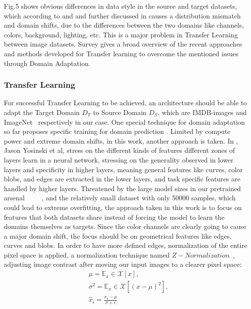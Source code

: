 \documentclass[conference]{IEEEtran}
\begin{document}
                Fig.5 shows obvious differences in data style in the source and target datasets, which according to \cite{lookatdata} and \cite{improving} and further discussed in \cite{decadesurv} causes a distribution mismatch and domain shifts, due to the differences between the two domains like channels, colors, background,
				lighting, etc. This is a major problem in Transfer Learning between 
				image datasets. Survey \cite{domainshift} gives a broad overview of the recent approaches and methods developed for Transfer learning to overcome the mentioned issues through Domain Adaptation. 
				
                
\subsubsection{Transfer Learning}
                For successful Transfer Learning to be achieved, an architecture should
				be able to adapt the Target Domain $D_T$ to Source Domain
				$D_S$, which are IMDB-images and ImageNet~\cite{imagenet} respectively in our case. One special technique for domain adaptation so far proposes specific  training for domain prediction \cite{ganin2016domain}.
				Limited by compute power and extreme domain shifts, in this work, another
				approach is taken.
				In \cite{howtransferable}, Jason Yosinski et al, stress on the different kinds of features different zones of layers learn in a neural network, stressing on the generality observed in lower layers and specificity in higher layers, meaning general features like curves, color blobs, and edges are extracted in the lower layers, and task specific features are handled by higher layers. 
				Threatened by the large model sizes in our pretrained arsenal~\cite{alexnet}~\cite{shufflenetv2}~\cite{vgg16}~\cite{resnet}~\cite{resnext}, and the relatively small dataset with only 50000 samples, which could lead to extreme overfitting, the approach taken in this work is to focus on features that both datasets share instead of forcing the 
				model to learn the domains themselves as targets. Since the color
				channels are clearly going to cause a major domain shift, the focus should
				be on geometrical features like edges, curves and blobs. In order to 
				have more defined edges, normalization of the entire pixel space is 
				applied, a normalization technique named $Z- Normalization$~\cite{normimproving}, adjusting image contrast after moving our input images to a clearer pixel space:
				\begin{equation}
				\begin{split}
				        &\mu = \mathbb{E}_{x} \in\mathcal{X}[x],\\
				        &\sigma^2 = \mathbb{E}_{x}\in\mathcal{X} [(x-\mu)^2],\\
				        &\hat{x}_i = \frac{x_i - \mu}{\sigma + \epsilon}
			    \end{split}
				\end{equation}
				       
\end{document}
